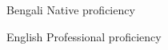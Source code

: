 
\begin{cvlanguages}

  \cvskill
    {Bengali}
    {Native proficiency}

  \cvskill
    {English}
    {Professional proficiency}

\end{cvlanguages}
